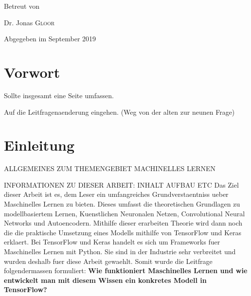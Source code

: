\begin{titlepage}

  \vfill
  Betreut von\par
  Dr. Jonas \textsc{Gloor}

  \vfill
  {\large Abgegeben im September 2019\par}
\end{titlepage}


\tableofcontents
\pagebreak

\chapter*{Vorwort}

Sollte insgesamt eine Seite umfassen.

Auf die Leitfragenaenderung eingehen. (Weg von der alten zur neunen Frage)

\chapter*{Einleitung}
ALLGEMEINES ZUM THEMENGEBIET MACHINELLES LERNEN

INFORMATIONEN ZU DIESER ARBEIT: INHALT AUFBAU ETC
Das Ziel dieser Arbeit ist es, dem Leser ein umfangreiches Grundverstaentniss
ueber Maschinelles Lernen zu bieten. Dieses umfasst die theoretischen Grundlagen
zu modellbasiertem Lernen, Kuenstlichen Neuronalen Netzen, Convolutional Neural
Networks und Autoencodern. Mithilfe dieser erarbeiten Theorie wird dann noch die
die praktische Umsetzung eines Modells mithilfe von TensorFlow und Keras
erklaert. Bei TensorFlow und Keras handelt es sich um Frameworks fuer
Maschinelles Lernen mit Python. Sie sind in der Industrie sehr verbreitet und
wurden deshalb fuer diese Arbeit gewaehlt.
\para{}
Somit wurde die Leitfrage folgendermassen formuliert:
\textbf{Wie funktioniert Maschinelles Lernen und wie entwickelt man mit diesem
  Wissen ein konkretes Modell in TensorFlow?}
\para{}


